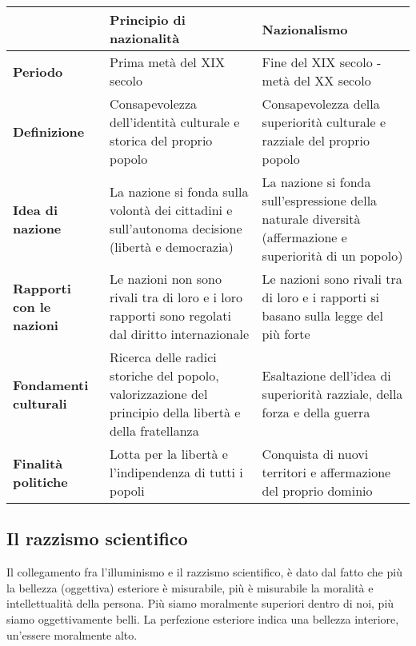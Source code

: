 \documentclass[a4paper]{article}
\begin{document}
\begin{table}[htbp]
    \begin{tabularx}{\textwidth}{p{2cm}|p{6cm}|p{6cm}}
        \hline
        & \textbf{Principio di nazionalità} & \textbf{Nazionalismo} \\
        \hline
        \textbf{Periodo} & Prima metà del XIX secolo & Fine del XIX secolo - metà del XX secolo \\
        \hline
        \textbf{Definizione} & Consapevolezza dell'identità
        culturale e storica del proprio popolo & Consapevolezza della superiorità
        culturale e razziale del proprio popolo \\
        \hline
        \textbf{Idea di nazione} & La nazione si fonda sulla volontà dei
        cittadini e sull'autonoma decisione
        (libertà e democrazia) & La nazione si fonda sull'espressione
        della naturale diversità (affermazione
        e superiorità di un popolo) \\
        \hline
        \textbf{Rapporti con le nazioni} & Le nazioni non sono rivali tra di loro e
        i loro rapporti sono regolati dal diritto
        internazionale & Le nazioni sono rivali tra di loro e i
        rapporti si basano sulla legge del più
        forte \\
        \hline
        \textbf{Fondamenti culturali} & Ricerca delle radici storiche del
        popolo, valorizzazione del principio
        della libertà e della fratellanza & Esaltazione dell'idea di superiorità
        razziale, della forza e della guerra \\
        \hline
        \textbf{Finalità politiche} & Lotta per la libertà e l'indipendenza
        di tutti i popoli & Conquista di nuovi territori e
        affermazione del proprio dominio \\
        \hline
    \end{tabularx}
\end{table}

\subsection{Il razzismo scientifico}


Il collegamento fra l'illuminismo e il razzismo scientifico, è dato dal fatto che più
la bellezza (oggettiva) esteriore è misurabile, più è misurabile la moralità e intellettualità della persona.
Più siamo moralmente superiori dentro di noi, più siamo oggettivamente belli.
La perfezione esteriore indica una bellezza interiore, un'essere moralmente alto.
\end{document}
